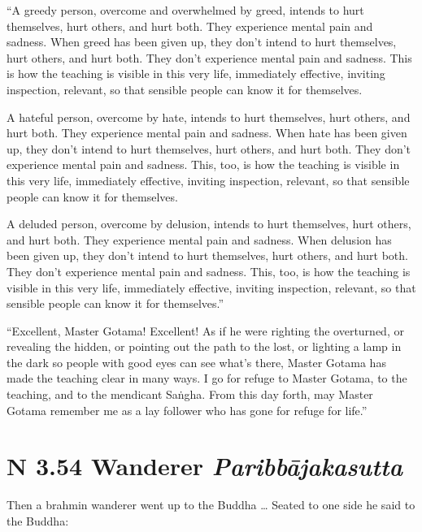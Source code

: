 \documentclass[12pt,openany]{book}%
\newcommand*{\suttatitleacronym}[1]{\smaller[2]{#1}\vspace*{.3em}}
\newcommand*{\suttatitletranslation}[1]{\linebreak{#1}}
\newcommand*{\suttatitleroot}[1]{\linebreak\smaller[2]\itshape{#1}}
\newcommand*{\tocacronym}[1]{\hspace*{-3.3em}{#1}\quad}
\newcommand*{\toctranslation}[1]{#1}
\newcommand*{\tocroot}[1]{(\textit{#1})}
\begin{document}
“A greedy person, overcome and overwhelmed by greed, intends to hurt themselves, hurt others, and hurt both. They experience mental pain and sadness. When greed has been given up, they don’t intend to hurt themselves, hurt others, and hurt both. They don’t experience mental pain and sadness. This is how the teaching is visible in this very life, immediately effective, inviting inspection, relevant, so that sensible people can know it for themselves. 

A hateful person, overcome by hate, intends to hurt themselves, hurt others, and hurt both. They experience mental pain and sadness. When hate has been given up, they don’t intend to hurt themselves, hurt others, and hurt both. They don’t experience mental pain and sadness. This, too, is how the teaching is visible in this very life, immediately effective, inviting inspection, relevant, so that sensible people can know it for themselves. 

A deluded person, overcome by delusion, intends to hurt themselves, hurt others, and hurt both. They experience mental pain and sadness. When delusion has been given up, they don’t intend to hurt themselves, hurt others, and hurt both. They don’t experience mental pain and sadness. This, too, is how the teaching is visible in this very life, immediately effective, inviting inspection, relevant, so that sensible people can know it for themselves.” 

“Excellent, Master Gotama! Excellent! As if he were righting the overturned, or revealing the hidden, or pointing out the path to the lost, or lighting a lamp in the dark so people with good eyes can see what’s there, Master Gotama has made the teaching clear in many ways. I go for refuge to Master Gotama, to the teaching, and to the mendicant \textsanskrit{Saṅgha}. From this day forth, may Master Gotama remember me as a lay follower who has gone for refuge for life.” 

%
\section*{{\suttatitleacronym AN 3.54}{\suttatitletranslation A Wanderer }{\suttatitleroot Paribbājakasutta}}
\addcontentsline{toc}{section}{\tocacronym{AN 3.54} \toctranslation{A Wanderer } \tocroot{Paribbājakasutta}}

Then a brahmin wanderer went up to the Buddha … Seated to one side he said to the Buddha: 
\end{document}
